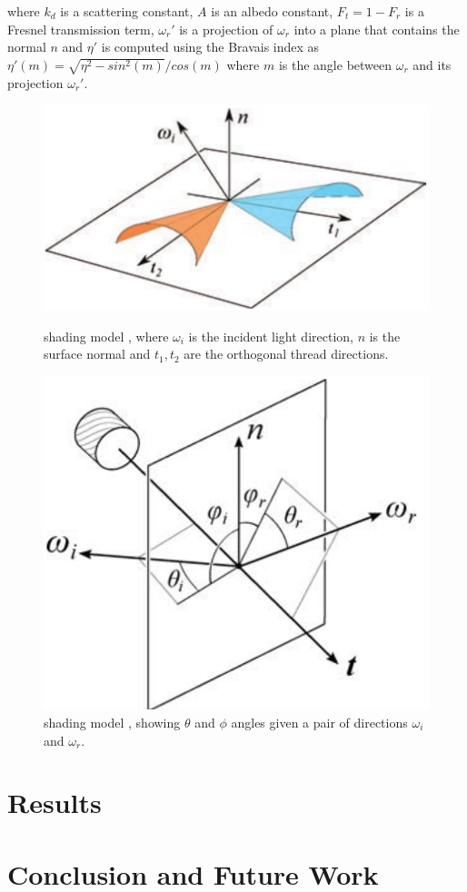 \documentclass[12pt]{article}
\begin{document}
where $k_d$ is a scattering constant, $A$ is an albedo constant, $F_t = 1 - F_r$ is a Fresnel transmission term, $\omega_r'$ is a projection of $\omega_r$ into a plane that contains the normal $n$ and $\eta'$ is computed using the Bravais index \cite{Marschner2003} as $\eta'(m) = \sqrt{\eta^2 - sin^2(m)}  / cos(m)$ where $m$ is the angle between $\omega_r$ and its projection $\omega_r'$.

\begin{figure}[ht!]
\begin{minipage}[b]{.45\textwidth}
\centering
\includegraphics[width=1\textwidth]{images/microcylinders}
	\caption{\citeauthor{Sadeghi2013} shading model \cite{Sadeghi2013}, where $\omega_i$ is the incident light direction, $n$ is the surface normal and $t_1,t_2$ are the orthogonal thread directions.}
	\label{fig:microcylinders}
\end{minipage}
\hfill
\begin{minipage}[b]{.45\textwidth}
\centering
\includegraphics[width=1\textwidth]{images/cloth_directions}
	\caption{\citeauthor{Sadeghi2013} shading model \cite{Sadeghi2013}, showing $\theta$ and $\phi$ angles given a pair of directions $\omega_i$ and $\omega_r$.}
	\label{fig:cloth_directions}
\end{minipage}
\end{figure}

\section{Results}

\section{Conclusion and Future Work}



\end{document}
